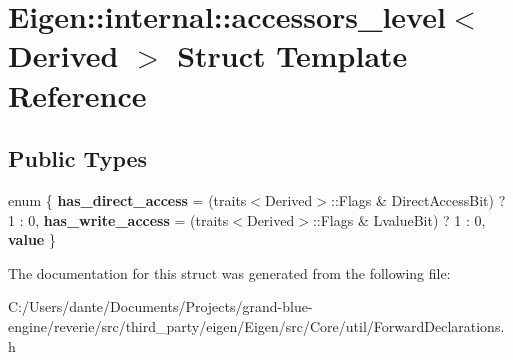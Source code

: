 \hypertarget{struct_eigen_1_1internal_1_1accessors__level}{}\section{Eigen\+::internal\+::accessors\+\_\+level$<$ Derived $>$ Struct Template Reference}
\label{struct_eigen_1_1internal_1_1accessors__level}
\subsection*{Public Types}
\begin{DoxyCompactItemize}
\item 
\mbox{\label{struct_eigen_1_1internal_1_1accessors__level_a1df66e1a71b33efed16631c722f95636}} 
enum \{ {\bfseries has\+\_\+direct\+\_\+access} = (traits$<$Derived$>$\+::Flags \& Direct\+Access\+Bit) ? 1 \+: 0, 
{\bfseries has\+\_\+write\+\_\+access} = (traits$<$Derived$>$\+::Flags \& Lvalue\+Bit) ? 1 \+: 0, 
{\bfseries value}
 \}
\end{DoxyCompactItemize}


The documentation for this struct was generated from the following file\+:\begin{DoxyCompactItemize}
\item 
C\+:/\+Users/dante/\+Documents/\+Projects/grand-\/blue-\/engine/reverie/src/third\+\_\+party/eigen/\+Eigen/src/\+Core/util/Forward\+Declarations.\+h\end{DoxyCompactItemize}
